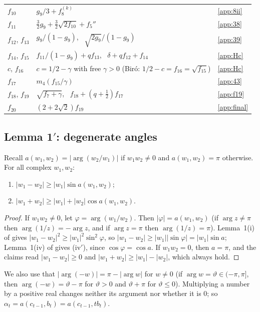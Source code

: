 \documentclass[11pt]{amsart}
\theoremstyle{remark}
\theoremstyle{plain}
\newcommand{\abs}[1]{\lvert #1\rvert}
\begin{document}
\begin{table}[ht]
\begin{tabular}{p{3.2cm}p{9.3cm}l}
$f_{10}$ & $g_9/3+f_8^{(k)}$ & \ref{app:8ii}\\
$f_{11}$ & $\frac32g_9+\frac32\sqrt{2f_{10}}+f_5''$ & \ref{app:38}\\
$f_{12}$, $f_{13}$ & $g_9/(1-g_9)$, \ $\sqrt{2g_9}/(1-g_9)$ & \ref{app:39}\\
$f_{14}$, $f_{15}$ & $f_{11}/(1-g_9)+qf_{13}$, \ $\delta+qf_{12}+f_{14}$ & \ref{app:Hc}\\
$c$, $f_{16}$ & $c=1/2-\gamma$ with free $\gamma>0$ (Bir\'o: $1/2-c=f_{16}=\sqrt{f_{15}}$) & \ref{app:Hc}\\
$f_{17}$ & $m_4(f_{15}/\gamma)$ & \ref{app:43}\\
$f_{18}$, $f_{19}$ & $\sqrt{f_7+\gamma}$, \ $f_{18}+(q+\frac12)f_{17}$ & \ref{app:f19}\\
$f_{20}$ & $(2+2\sqrt2)f_{19}$ & \ref{app:final}\\
\bottomrule
\end{tabular}
\end{table}

\subsection{Lemma 1\texorpdfstring{$'$}{'}: degenerate angles}\label{app:conv}
Recall $a(w_1,w_2)=\abs{\arg(w_2/w_1)}$ if $w_1w_2\ne0$ and $a(w_1,w_2)=\pi$ otherwise. For all complex $w_1,w_2$:
\begin{enumerate}[label=(\roman*$'$),start=3,leftmargin=*]
\item $\abs{w_1-w_2}\ge\abs{w_1}\sin a(w_1,w_2)$;
\item $\abs{w_1+w_2}\ge\abs{w_1}+\abs{w_2}\cos a(w_1,w_2)$.
\end{enumerate}
\begin{proof}
If $w_1w_2\ne0$, let $\varphi=\arg(w_1/w_2)$. Then $\abs\varphi=a(w_1,w_2)$ (if $\arg z\ne\pi$ then $\arg(1/z)=-\arg z$, and if $\arg z=\pi$ then $\arg(1/z)=\pi$). Lemma~1(i) of \cite{Bir00b} gives $\abs{w_1-w_2}^2\ge\abs{w_1}^2\sin^2\varphi$, so $\abs{w_1-w_2}\ge\abs{w_1}\abs{\sin\varphi}=\abs{w_1}\sin a$; Lemma~1(iv) of \cite{Bir00b} gives (iv$'$), since $\cos\varphi=\cos a$. If $w_1w_2=0$, then $a=\pi$, and the claims read $\abs{w_1-w_2}\ge0$ and $\abs{w_1+w_2}\ge\abs{w_1}-\abs{w_2}$, which always hold.
\end{proof}
We also use that $\abs{\arg(-w)}=\pi-\abs{\arg w}$ for $w\ne0$ (if $\arg w=\vartheta\in(-\pi,\pi]$, then $\arg(-w)=\vartheta-\pi$ for $\vartheta>0$ and $\vartheta+\pi$ for $\vartheta\le0$). Multiplying a number by a positive real changes neither its argument nor whether it is $0$; so $\alpha_t=a(c_{t-1},b_t)=a(c_{t-1},tb_t)$.
\end{document}
